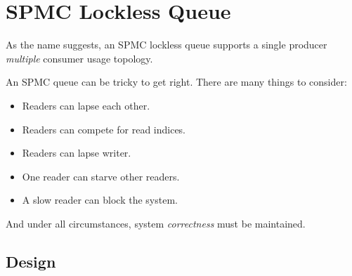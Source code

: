 % 

\chapter{SPMC Lockless Queue}

As the name suggests, an SPMC lockless queue supports a single producer
\textit{multiple} consumer usage topology.\\


\begin{center}
\end{center}

An SPMC queue can be tricky to get right. There are many things to consider:
\begin{itemize}
    \item Readers can lapse each other.
    \item Readers can compete for read indices.
    \item Readers can lapse writer.
    \item One reader can starve other readers.
    \item A slow reader can block the system.
\end{itemize}

And under all circumstances, system \textit{correctness} must be maintained.

\section{Design}

